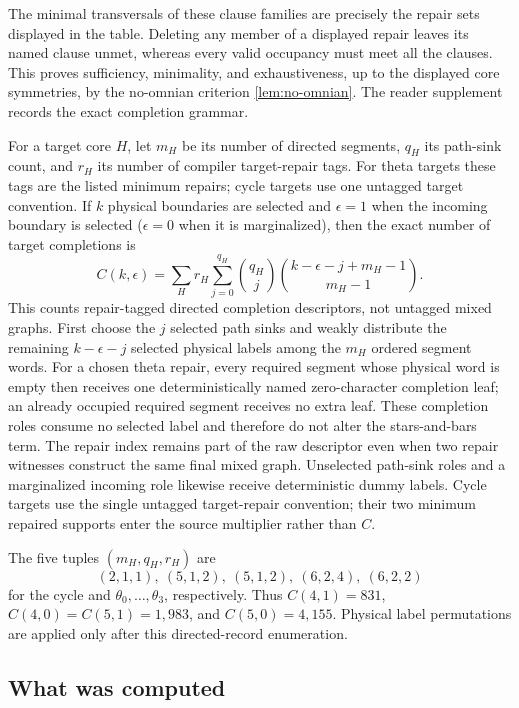 \documentclass[11pt]{article}
\theoremstyle{remark}
\newcommand{\1}{\mathbf 1}
\begin{document}
The minimal transversals of these clause families are precisely the repair
sets displayed in the table.  Deleting any member of a displayed repair
leaves its named clause unmet, whereas every valid occupancy must meet all
the clauses.  This proves sufficiency, minimality, and exhaustiveness, up to
the displayed core symmetries, by the no-omnian criterion
\cref{lem:no-omnian}.  The reader supplement records the exact completion
grammar.

For a target core \(H\), let \(m_H\) be its number of directed segments,
\(q_H\) its path-sink count, and \(r_H\) its number of compiler
target-repair tags.  For theta targets these tags are the listed minimum
repairs; cycle targets use one untagged target convention.  If \(k\)
physical boundaries are selected and
\(\epsilon=1\) when the incoming boundary is selected
(\(\epsilon=0\) when it is marginalized), then the exact number of target
completions is
\begin{equation}\label{eq:completion-count}
 C(k,\epsilon)=\sum_H r_H\sum_{j=0}^{q_H}
 \binom{q_H}{j}
 \binom{k-\epsilon-j+m_H-1}{m_H-1}.
\end{equation}
This counts repair-tagged directed completion descriptors, not untagged mixed
graphs.  First choose the \(j\) selected path sinks and weakly distribute the
remaining \(k-\epsilon-j\) selected physical labels among the \(m_H\)
ordered segment words.  For a chosen theta repair, every required segment
whose physical word is empty then receives one deterministically named
zero-character completion leaf; an already occupied required segment
receives no extra leaf.  These completion roles consume no selected label and
therefore do not alter the stars-and-bars term.  The repair index remains part
of the raw descriptor even when two repair witnesses construct the same final
mixed graph.  Unselected path-sink roles and a marginalized incoming role
likewise receive deterministic dummy labels.  Cycle targets use the single
untagged target-repair convention; their two minimum repaired supports enter
the source multiplier rather than \(C\).

The five tuples \((m_H,q_H,r_H)\) are
\[
 (2,1,1),\ (5,1,2),\ (5,1,2),\ (6,2,4),\ (6,2,2)
\]
for the cycle and \(\theta_0,\ldots,\theta_3\), respectively.  Thus
\(C(4,1)=831\), \(C(4,0)=C(5,1)=1{,}983\), and
\(C(5,0)=4{,}155\).  Physical label permutations are applied only after
this directed-record enumeration.

\subsection{What was computed}
\end{document}
